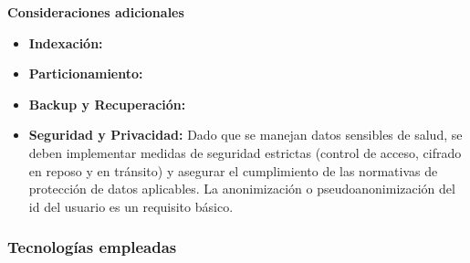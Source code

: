 \textbf{Consideraciones adicionales}
\begin{itemize}
    \item \textbf{Indexación: } 
    \item \textbf{Particionamiento:}    
    \item \textbf{Backup y Recuperación: } 
    \item \textbf{Seguridad y Privacidad: } Dado que se manejan datos sensibles de salud, se deben implementar medidas de seguridad estrictas (control de acceso, cifrado en reposo y en tránsito) y asegurar el cumplimiento de las normativas de protección de datos aplicables. La anonimización o pseudoanonimización del id del usuario es un requisito básico.
\end{itemize}

\subsubsection{Tecnologías empleadas}

